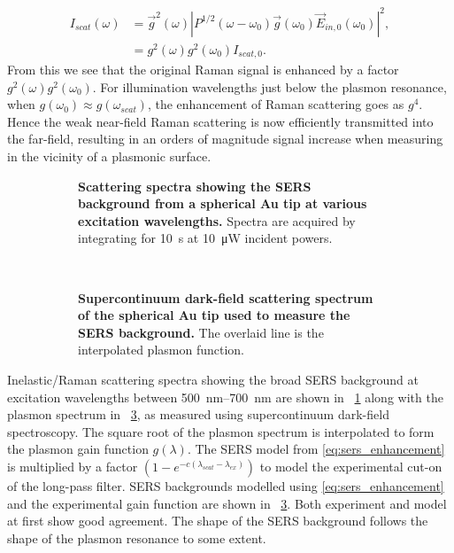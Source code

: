 \documentclass{article}
\begin{document}
\begin{align}
I_{scat}(\omega) &= \vec{g}^2(\omega) \left| P^{1/2}(\omega - \omega_0) \vec{g}(\omega_0) \vec{E}_{in, 0}(\omega_0) \right|^2, \\
			  &= g^2(\omega)g^2(\omega_0) I_{scat,0}.
\label{eq:sers_enhancement}
\end{align}
From this we see that the original Raman signal is enhanced by a factor $g^2(\omega)g^2(\omega_0)$. For illumination wavelengths just below the plasmon resonance, when $g(\omega_0) \approx g(\omega_{scat})$, the enhancement of Raman scattering goes as $g^4$. Hence the weak near-field Raman scattering is now efficiently transmitted into the far-field, resulting in an orders of magnitude  signal increase when measuring in the vicinity of a plasmonic surface.

\begin{figure}[h]
\begin{subfigure}[t]{0.49\textwidth}
\caption[Scattering spectra showing the SERS background from a spherical Au tip at various excitation wavelengths]{\textbf{Scattering spectra showing the SERS background from a spherical Au tip at various excitation wavelengths.} Spectra are acquired by integrating for \SI{10}{s} at \SI{10}{\micro\watt} incident powers.}
\label{fig:sers_backgrounds}
\end{subfigure}
~
\begin{subfigure}[t]{0.49\textwidth}
\caption[Supercontinuum dark-field scattering spectrum of the spherical Au tip used to measure the SERS background]{\textbf{Supercontinuum dark-field scattering spectrum of the spherical Au tip used to measure the SERS background.} The overlaid line is the interpolated plasmon function.}
\label{fig:sers_plasmon}
\end{subfigure}
\caption{}
\end{figure}

{\color{red}Inelastic/Raman} scattering spectra showing the broad SERS background at excitation wavelengths between \SIrange{500}{700}{nm} are shown in \figurename~\ref{fig:sers_backgrounds} along with the plasmon spectrum in \figurename~\ref{fig:sers_plasmon}, as measured using supercontinuum dark-field spectroscopy. The square root of the plasmon spectrum is interpolated to form the plasmon gain function $g(\lambda)$. The SERS model from \eqref{eq:sers_enhancement} is multiplied by a factor $\left( 1 - e^{-c(\lambda_{scat}-\lambda_{ex})} \right)$ to model the experimental cut-on of the long-pass filter. SERS backgrounds modelled using \eqref{eq:sers_enhancement} and the experimental gain function are shown in \figurename~\ref{fig:sers_plasmon}.
Both experiment and model at first show good agreement. The shape of the SERS background follows the shape of the plasmon resonance to some extent.
\end{document}
